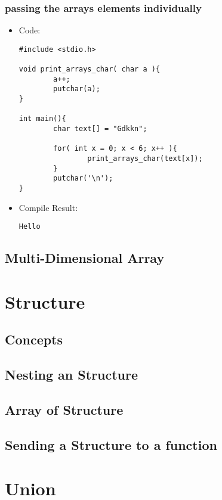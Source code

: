 \documentclass{book}
\begin{document}
\subsubsection{passing the arrays elements individually}

\begin{itemize}
  \item Code:
\begin{lstlisting}
#include <stdio.h>

void print_arrays_char( char a ){
        a++;
        putchar(a);
}

int main(){
        char text[] = "Gdkkn";

        for( int x = 0; x < 6; x++ ){
                print_arrays_char(text[x]);
        }
        putchar('\n');
}
\end{lstlisting}
\item Compile Result:
\begin{lstlisting}
Hello
\end{lstlisting}
\end{itemize}





\subsection{Multi-Dimensional Array}
\section{Structure}
\subsection{Concepts}
\subsection{Nesting an Structure}
\subsection{Array of Structure}
\subsection{Sending a Structure to a function}
\section{Union}
\end{document}

